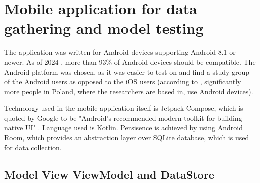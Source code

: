 
\section{Mobile application for data gathering and model testing}

The application was written for Android devices supporting Android 8.1 or newer. As of 2024 \cite{androidStats}, more than 93\% of Android devices should be compatible. The Android platform was chosen, as it was easier to test on and find a study group of the Android users as opposed to the iOS users (according to \cite{operatingSystemDistribution}, significantly more people in Poland, where the researchers are based in, use Android devices).

Technology used in the mobile application itself is Jetpack Compose, which is quoted by Google to be "Android's recommended modern toolkit for building native UI" \cite{jetpackCompose}. Language used is Kotlin. Persisence is achieved by using Android Room, which provides an abstraction layer over SQLite database, which is used for data collection.

\subsection{Model View ViewModel and DataStore}

